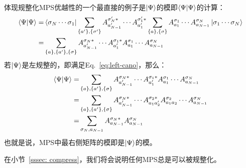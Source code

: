 \documentclass{article}
\begin{document}
体现规整化MPS优越性的一个最直接的例子是$\ket{\Psi}$的模即$\braket{\Psi|\Psi}$的计算：
\begin{equation}
\begin{aligned}
    \braket{\Psi|\Psi} = & \bra{ \sigma_N\cdots\sigma_1 }
    \sum_{\{a'\},\{\sigma'\}}  A^{\sigma'_N*}_{a'_{N-1}} \cdots
            A^{\sigma'_1*}_{a'_1}
           \sum_{\{a\},\{\sigma\}}
     A^{\sigma_1}_{a_1}  \cdots
           A^{\sigma_N}_{a_{N-1}}  \ket{ \sigma_1\cdots\sigma_N }    \\
           = & \sum_{\{a\}, \{a'\},\{\sigma\}} A^{\sigma_N*}_{a'_{N-1}} \cdots
            A^{\sigma_1*}_{a'_1} A^{\sigma_1}_{a_1}  \cdots
           A^{\sigma_N}_{a_{N-1}}
\end{aligned}
\end{equation}
若$\ket{\Psi}$是左规整的，即满足Eq.~\ref{eq:left-cano}，那么：
\begin{equation}
\begin{aligned}
     \braket{\Psi|\Psi} = & \sum_{\{a\}, \{a'\},\{\sigma\}} A^{\sigma_N*}_{a'_{N-1}} \cdots
            A^{\sigma_1*}_{a'_1} A^{\sigma_1}_{a_1}  \cdots
           A^{\sigma_N}_{a_{N-1}} \\ 
           = & \sum_{\{a\}, \{a'\},\{\sigma\}} A^{\sigma_N*}_{a'_{N-1}} \cdots
            A^{\sigma_2*}_{a_1a'_2} A^{\sigma_2}_{a_1a_2}  \cdots
           A^{\sigma_N}_{a_{N-1}} \\
           = & \sum_{\sigma_N, a_{N-1}} A^{\sigma_N*}_{a_{N-1}}
           A^{\sigma_N}_{a_{N-1}}
\end{aligned}
\end{equation}
也就是说，MPS中最右侧矩阵的模即是$\ket{\Psi}$的模。

在小节~\ref{sssec: compress}，我们将会说明任何MPS总是可以被规整化。
\end{document}
